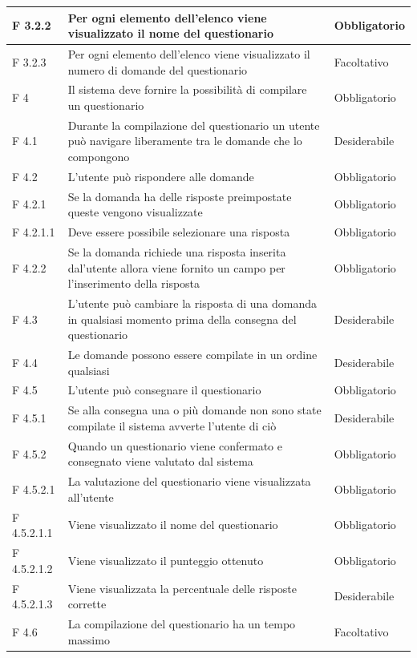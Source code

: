 \documentclass[a4paper,11pt]{article}
\begin{document}
\begin{longtable}{p{}p{}p{}}
\midrule
F 3.2.2 & Per ogni elemento dell'elenco viene visualizzato il nome del questionario & Obbligatorio\\
\midrule
F 3.2.3 & Per ogni elemento dell'elenco viene visualizzato il numero di domande del questionario & Facoltativo\\
\midrule
F 4 & Il sistema deve fornire la possibilità di compilare un questionario & Obbligatorio\\
\midrule
F 4.1 & Durante la compilazione del questionario un utente può navigare liberamente tra le domande che lo compongono & Desiderabile\\
\midrule
F 4.2 & L'utente può rispondere alle domande & Obbligatorio\\
\midrule
F 4.2.1 & Se la domanda ha delle risposte preimpostate queste vengono visualizzate & Obbligatorio\\
\midrule
F 4.2.1.1 & Deve essere possibile selezionare una risposta & Obbligatorio\\
\midrule
F 4.2.2 & Se la domanda richiede una risposta inserita dal'utente allora viene fornito un campo per l'inserimento della risposta & Obbligatorio\\
\midrule
F 4.3 & L'utente può cambiare la risposta di una domanda in qualsiasi momento prima della consegna del questionario & Desiderabile\\
\midrule
F 4.4 & Le domande possono essere compilate in un ordine qualsiasi & Desiderabile\\
\midrule
F 4.5 & L'utente può consegnare il questionario & Obbligatorio\\
\midrule
F 4.5.1 & Se alla consegna una o più domande non sono state compilate il sistema avverte l'utente di ciò & Desiderabile\\
\midrule
F 4.5.2 & Quando un questionario viene confermato e consegnato viene valutato dal sistema & Obbligatorio\\
\midrule
F 4.5.2.1 & La valutazione del questionario viene visualizzata all'utente & Obbligatorio\\
\midrule
F 4.5.2.1.1 & Viene visualizzato il nome del questionario & Obbligatorio\\
\midrule
F 4.5.2.1.2 & Viene visualizzato il punteggio ottenuto & Obbligatorio\\
\midrule
F 4.5.2.1.3 & Viene visualizzata la percentuale delle risposte corrette & Desiderabile\\
\midrule
F 4.6 & La compilazione del questionario ha un tempo massimo & Facoltativo\\

\end{longtable}
\end{document}

